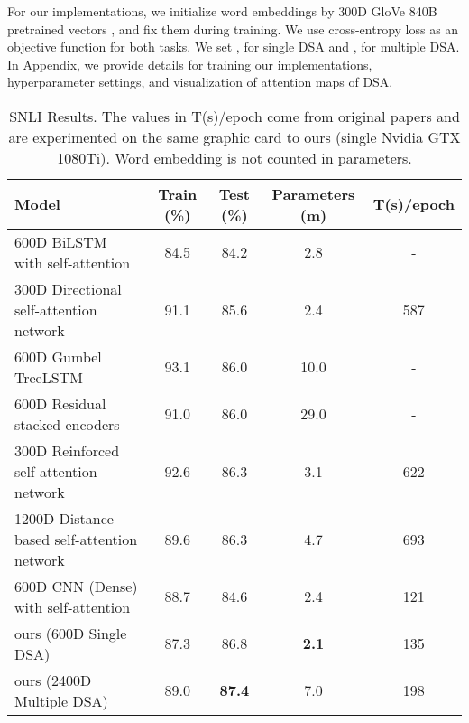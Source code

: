 \documentclass[11pt,a4paper]{article}
\begin{document}
For our implementations, we initialize word embeddings by 300D GloVe 840B pretrained vectors \cite{glove}, and fix them during training. We use cross-entropy loss as an objective function for both tasks. We set ,  for single DSA and ,  for multiple DSA. In Appendix, we provide details for training our implementations, hyperparameter settings, and visualization of attention maps of DSA.







\setlength{\tabcolsep}{0.4em}
\begin{table*}[t]
	\small
	\begin{center}
		\begin{tabular}{|l|c|c|c|c|}
		
			\hline
			{\bf Model}                & {\bf Train (\%)} & {\bf Test (\%)}  & {\bf Parameters (m)} & {\bf T(s)/epoch}  \\ 
			\hline
600D BiLSTM with self-attention \cite{Yang}                & 84.5    & 84.2 & 2.8  & -      \\
300D Directional self-attention network \cite{disan}                 & 91.1    & 85.6 & 2.4  & { 587} \\
600D Gumbel TreeLSTM~\cite{gumble}                 & 93.1    & 86.0 & 10.0  &  -    \\
			600D Residual stacked encoders \cite{residual}              & 91.0    & 86.0 & 29.0  &    -   \\
			300D Reinforced self-attention network \cite{reinforce}                & 92.6    & 86.3 & 3.1  & 622\\
			1200D Distance-based self-attention network \cite{distance}               & 89.6    & 86.3 & 4.7  & 693  \\
\hline
		    600D CNN (Dense) with self-attention & 88.7 & 84.6 & {2.4} &  121     \\
		    ours (600D Single DSA)   & 87.3 & 86.8 & \textbf{2.1}  & 135      \\
		    ours (2400D Multiple DSA)   & 89.0    & \textbf{87.4} & {7.0}  & 198      \\
		    \hline
		\end{tabular}
	\end{center}
	\caption{SNLI Results. The values in T(s)/epoch come from original papers and are experimented on the same graphic card to ours (single Nvidia GTX 1080Ti). Word embedding is not counted in parameters.}
	\label{tab:SNLI}
\end{table*}
\end{document}

